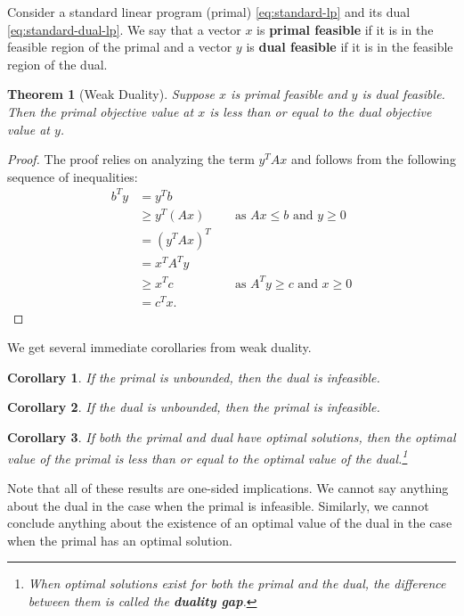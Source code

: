 \documentclass[
]{book}
\newtheorem{theorem}{Theorem}[chapter]
\newtheorem{corollary}{Corollary}[chapter]
\theoremstyle{definition}
\theoremstyle{definition}
\theoremstyle{definition}
\theoremstyle{definition}
\theoremstyle{remark}
\begin{document}
Consider a standard linear program (primal) \eqref{eq:standard-lp} and its dual
\eqref{eq:standard-dual-lp}. We say that a vector \(x\) is \textbf{primal feasible} if it is in the feasible
region of the primal and a vector \(y\) is \textbf{dual feasible} if it is in the feasible region of the
dual.

\begin{theorem}[Weak Duality]
\protect\hypertarget{thm:weak-duality}{}\label{thm:weak-duality}Suppose \(x\) is primal feasible and \(y\) is dual feasible. Then the primal objective value at \(x\) is
less than or equal to the dual objective value at \(y\).
\end{theorem}

\begin{proof}
The proof relies on analyzing the term \(y^T A x\) and follows from the following sequence of inequalities:
\begin{align*} 
b^T y 
  & = y^T b \\
  & \ge y^T (Ax) && \mbox{ as } Ax \leq b \mbox{ and } y \geq 0 \\
  & = (y^T A x)^T \\
  & = x^T A^T y \\ 
  & \ge x^T c && \mbox{ as } A^Ty \geq c \mbox{ and } x \geq 0 \\
  & = c^T x.
\end{align*}
\end{proof}

We get several immediate corollaries from weak duality.

\begin{corollary}
If the primal is unbounded, then the dual is infeasible.
\end{corollary}

\begin{corollary}
If the dual is unbounded, then the primal is infeasible.
\end{corollary}

\begin{corollary}
\protect\hypertarget{cor:duality-gap}{}\label{cor:duality-gap}If both the primal and dual have optimal solutions, then the optimal value of the primal is less
than or equal to the optimal value of the dual.\footnote{When optimal solutions exist for both the primal
  and the dual, the difference between them is called the \textbf{duality gap}.}
\end{corollary}

Note that all of these results are one-sided implications. We cannot say anything about the dual in
the case when the primal is infeasible. Similarly, we cannot conclude anything about the existence
of an optimal value of the dual in the case when the primal has an optimal solution.
\end{document}
